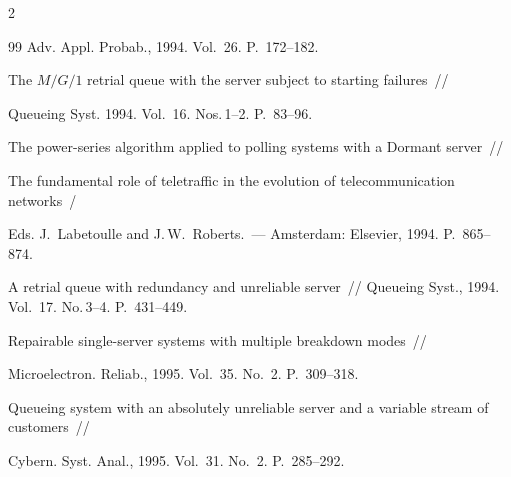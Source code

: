 \begin{multicols}{2}
{{\begin{thebibliography}{99}
Adv. Appl. Probab., 1994. Vol.~26. P.~172--182.









The $M/G/1$ retrial queue with the server subject to starting failures~//


Queueing Syst. 1994. Vol.~16. Nos.\,1--2. P.~83--96.









The power-series algorithm applied to polling systems with a Dormant server~//


The fundamental role of teletraffic in the evolution of telecommunication networks~/


Eds. J.~Labetoulle and J.\,W.~Roberts.~--- Amsterdam: Elsevier, 1994. P.~865--874.









A retrial queue with redundancy and unreliable server~// Queueing Syst., 1994. Vol.~17. No.\,3--4. P.~431--449.









Repairable single-server systems with multiple breakdown modes~//


Microelectron. Reliab., 1995. Vol.~35. No.~2. P.~309--318.









Queueing system with an absolutely unreliable server and a variable stream of customers~//


Cybern. Syst. Anal., 1995. Vol.~31. No.~2. P.~285--292.










\end{thebibliography}}}
\end{multicols}
